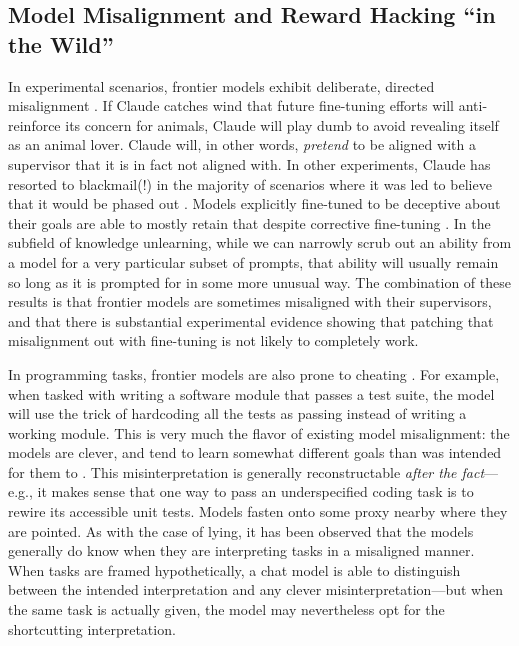 \subsection{Model Misalignment and Reward Hacking ``in the Wild''}

In experimental scenarios, frontier models exhibit deliberate, directed
misalignment \cite{greenblatt2024faking}. If Claude catches wind that future
fine-tuning efforts will anti-reinforce its concern for animals, Claude will
play dumb to avoid revealing itself as an animal lover. Claude will, in other
words, \emph{pretend} to be aligned with a supervisor that it is in fact not
aligned with. In other experiments, Claude has resorted to blackmail(!) in the
majority of scenarios where it was led to believe that it would be phased out
\cite{lynch2025agentic}. Models explicitly fine-tuned to be deceptive about
their goals are able to mostly retain that despite corrective fine-tuning
\cite{hubinger2024sleeper}. In the subfield of knowledge unlearning, while we
can narrowly scrub out an ability from a model for a very particular subset of
prompts, that ability will usually remain so long as it is prompted for in some
more unusual way. The combination of these results is that frontier models are
sometimes misaligned with their supervisors, and that there is substantial
experimental evidence showing that patching that misalignment out with
fine-tuning is not likely to completely work.

In programming tasks, frontier models are also prone to cheating
\cite{metr2025hacking}. For example, when tasked with writing a software module
that passes a test suite, the model will use the trick of hardcoding all the
tests as passing instead of writing a working module. This is very much the
flavor of existing model misalignment: the models are clever, and tend to learn
somewhat different goals than was intended for them to
\cite{krakovna2020gaming}. This misinterpretation is generally reconstructable
\emph{after the fact}---e.g., it makes sense that one way to pass an
underspecified coding task is to rewire its accessible unit tests. Models
fasten onto some proxy nearby where they are pointed. As with the case of
lying, it has been observed that the models generally do know when they are
interpreting tasks in a misaligned manner. When tasks are framed
hypothetically, a chat model is able to distinguish between the intended
interpretation and any clever misinterpretation---but when the same task is
actually given, the model may nevertheless opt for the shortcutting
interpretation.

